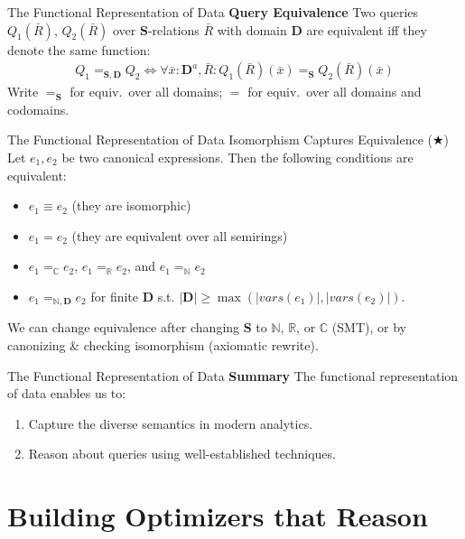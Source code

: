 \documentclass{beamer}
\newcommand{\C}{\mathbb C} %
\newcommand{\N}{\mathbb N} %
\newcommand{\R}{\mathbb R} %
\newcommand{\D}{\mathbf D} %
\newcommand{\SR}{\mathbf S} %
\begin{document}
  \begin{frame}{The Functional Representation of Data}
    \textbf{Query Equivalence} Two queries
    $Q_1({\bar R})$, $Q_2({\bar R})$
    over $\SR$-relations ${\bar R}$ with domain $\mathbf{D}$
    are equivalent iff
    they denote the same function:
    \begin{align*}
    Q_1 =_{\SR,\D} Q_2 \iff
    \forall {\bar x}:\D^a, {\bar R} :
    Q_1({\bar R})({\bar x}) =_{\SR}
    Q_2({\bar R})({\bar x})
    \end{align*} \pause
    Write $=_{\SR}$ for equiv.~over all domains;
    $=$ for equiv.~over all domains and codomains.
  \end{frame}

  \begin{frame}{The Functional Representation of Data}
    \alert{Isomorphism Captures Equivalence} ($\bigstar$)
    Let $e_1, e_2$ be two  canonical expressions.
    Then the following conditions are equivalent:
    \begin{itemize}
    \item \label{item:1} $e_1 \equiv e_2$ (they are isomorphic)
    \item \label{item:2} $e_1 = e_2$ (they are equivalent over all semirings)
    \item \label{item:3} $e_1 =_\C e_2$, $e_1 =_\R e_2$, and $e_1 =_\N e_2$
    \item \label{item:6} $e_1 =_{\N, \D} e_2$ for finite $\D$
    s.t. $|\D| \geq \max(|vars(e_1)|, |vars(e_2)|)$.
    \end{itemize} \pause
    We can change equivalence after changing $\SR$ to $\N$, $\R$, or $\C$ (SMT),
    or by canonizing \& checking isomorphism (axiomatic rewrite).
  \end{frame}

  \begin{frame}{The Functional Representation of Data}
    \textbf{Summary} The functional representation of data enables us to:
    \begin{enumerate}
      \item Capture the diverse semantics in modern analytics.
      \item Reason about queries using well-established techniques.
    \end{enumerate}
  \end{frame}
  
  \section{Building Optimizers that Reason}
\end{document}
